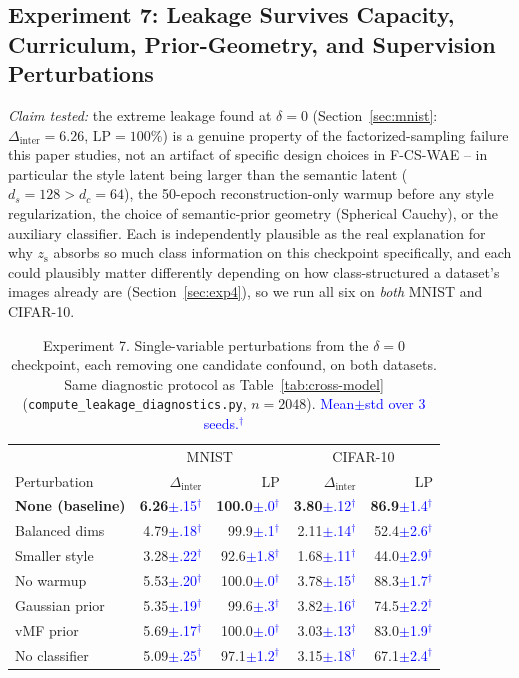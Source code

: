 \documentclass[10pt,letterpaper]{article}
\newcommand{\ours}{F-CS-WAE}
\newcommand{\zs}{z_{\mathrm{s}}}
\newcommand{\pj}[1]{\textcolor{blue}{#1$^{\dagger}$}}
\begin{document}
\subsection{Experiment 7: Leakage Survives Capacity, Curriculum, Prior-Geometry, and Supervision Perturbations}
\label{sec:exp7}

\emph{Claim tested:} the extreme leakage found at $\delta{=}0$
(Section~\ref{sec:mnist}: $\Delta_{\mathrm{inter}}{=}6.26$, LP$=100\%$) is a
genuine property of the factorized-sampling failure this paper studies, not
an artifact of specific design choices in \ours{} -- in particular the
style latent being larger than the semantic latent
($d_s{=}128{>}d_c{=}64$), the 50-epoch reconstruction-only warmup before any
style regularization, the choice of semantic-prior geometry (Spherical
Cauchy), or the auxiliary classifier. Each is independently plausible as
the real explanation for why $\zs$ absorbs so much class information on
this checkpoint specifically, and each could plausibly matter differently
depending on how class-structured a dataset's images already are
(Section~\ref{sec:exp4}), so we run all six on \emph{both} MNIST and
CIFAR-10.

\begin{table}[t]
\centering
\small
\caption{Experiment 7. Single-variable perturbations from the $\delta{=}0$
         checkpoint, each removing one candidate confound, on both datasets.
         Same diagnostic protocol as Table~\ref{tab:cross-model}
         (\texttt{compute\_leakage\_diagnostics.py}, $n{=}2048$).
         \pj{Mean$\pm$std over 3 seeds.}}
\label{tab:capacity-audit}
\small
\setlength{\tabcolsep}{3.5pt}
\begin{tabular}{lrrrr}
\toprule
& \multicolumn{2}{c}{MNIST} & \multicolumn{2}{c}{CIFAR-10} \\
Perturbation & $\Delta_{\mathrm{inter}}$ & LP & $\Delta_{\mathrm{inter}}$ & LP \\
\midrule
\textbf{None (baseline)} & \textbf{6.26}\pj{$\pm$.15} & \textbf{100.0}\pj{$\pm$.0} & \textbf{3.80}\pj{$\pm$.12} & \textbf{86.9}\pj{$\pm$1.4} \\
Balanced dims & 4.79\pj{$\pm$.18} & 99.9\pj{$\pm$.1} & 2.11\pj{$\pm$.14} & 52.4\pj{$\pm$2.6} \\
Smaller style & 3.28\pj{$\pm$.22} & 92.6\pj{$\pm$1.8} & 1.68\pj{$\pm$.11} & 44.0\pj{$\pm$2.9} \\
No warmup & 5.53\pj{$\pm$.20} & 100.0\pj{$\pm$.0} & 3.78\pj{$\pm$.15} & 88.3\pj{$\pm$1.7} \\
Gaussian prior & 5.35\pj{$\pm$.19} & 99.6\pj{$\pm$.3} & 3.82\pj{$\pm$.16} & 74.5\pj{$\pm$2.2} \\
vMF prior & 5.69\pj{$\pm$.17} & 100.0\pj{$\pm$.0} & 3.03\pj{$\pm$.13} & 83.0\pj{$\pm$1.9} \\
No classifier & 5.09\pj{$\pm$.25} & 97.1\pj{$\pm$1.2} & 3.15\pj{$\pm$.18} & 67.1\pj{$\pm$2.4} \\
\bottomrule
\end{tabular}
\end{table}
\end{document}
